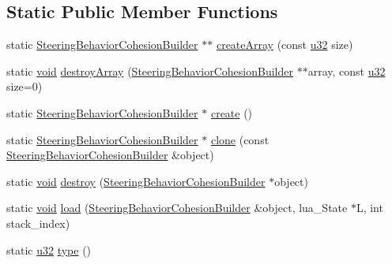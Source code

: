\subsection*{Static Public Member Functions}
\begin{DoxyCompactItemize}
\item 
static \mbox{\hyperlink{classnjli_1_1_steering_behavior_cohesion_builder}{Steering\+Behavior\+Cohesion\+Builder}} $\ast$$\ast$ \mbox{\hyperlink{classnjli_1_1_steering_behavior_cohesion_builder_afc983284eeaa6b00cc099d01fffb9ba9}{create\+Array}} (const \mbox{\hyperlink{_util_8h_a10e94b422ef0c20dcdec20d31a1f5049}{u32}} size)
\item 
static \mbox{\hyperlink{_thread_8h_af1e856da2e658414cb2456cb6f7ebc66}{void}} \mbox{\hyperlink{classnjli_1_1_steering_behavior_cohesion_builder_a38487036a881b6da1319297ba40c1844}{destroy\+Array}} (\mbox{\hyperlink{classnjli_1_1_steering_behavior_cohesion_builder}{Steering\+Behavior\+Cohesion\+Builder}} $\ast$$\ast$array, const \mbox{\hyperlink{_util_8h_a10e94b422ef0c20dcdec20d31a1f5049}{u32}} size=0)
\item 
static \mbox{\hyperlink{classnjli_1_1_steering_behavior_cohesion_builder}{Steering\+Behavior\+Cohesion\+Builder}} $\ast$ \mbox{\hyperlink{classnjli_1_1_steering_behavior_cohesion_builder_ab6f85e6d0427c05ad846f422e92930b6}{create}} ()
\item 
static \mbox{\hyperlink{classnjli_1_1_steering_behavior_cohesion_builder}{Steering\+Behavior\+Cohesion\+Builder}} $\ast$ \mbox{\hyperlink{classnjli_1_1_steering_behavior_cohesion_builder_ac8a51456192f7cbc581e5ffec74336d6}{clone}} (const \mbox{\hyperlink{classnjli_1_1_steering_behavior_cohesion_builder}{Steering\+Behavior\+Cohesion\+Builder}} \&object)
\item 
static \mbox{\hyperlink{_thread_8h_af1e856da2e658414cb2456cb6f7ebc66}{void}} \mbox{\hyperlink{classnjli_1_1_steering_behavior_cohesion_builder_ae5df0f25d375e93748736de337e22a2d}{destroy}} (\mbox{\hyperlink{classnjli_1_1_steering_behavior_cohesion_builder}{Steering\+Behavior\+Cohesion\+Builder}} $\ast$object)
\item 
static \mbox{\hyperlink{_thread_8h_af1e856da2e658414cb2456cb6f7ebc66}{void}} \mbox{\hyperlink{classnjli_1_1_steering_behavior_cohesion_builder_a4c104dc7915ecc396287775c5c2763d2}{load}} (\mbox{\hyperlink{classnjli_1_1_steering_behavior_cohesion_builder}{Steering\+Behavior\+Cohesion\+Builder}} \&object, lua\+\_\+\+State $\ast$L, int stack\+\_\+index)
\item 
static \mbox{\hyperlink{_util_8h_a10e94b422ef0c20dcdec20d31a1f5049}{u32}} \mbox{\hyperlink{classnjli_1_1_steering_behavior_cohesion_builder_a2269a31c758ecafce57ada527f1510c9}{type}} ()
\end{DoxyCompactItemize}

